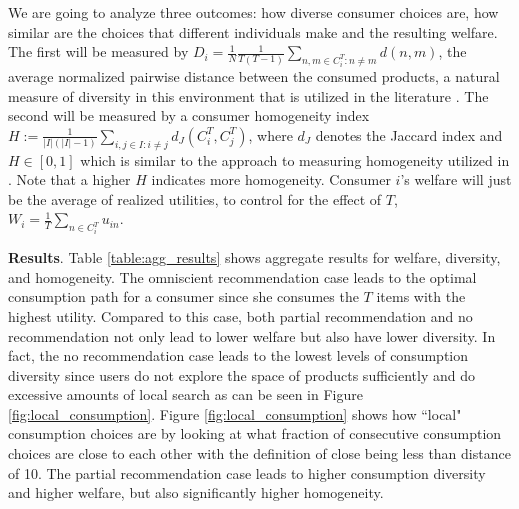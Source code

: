 \documentclass[sigconf]{acmart}
\begin{document}
We are going to analyze three outcomes: how diverse consumer choices are, how similar are the choices that different individuals make and the resulting welfare. The first will be measured by $D_i =\frac{1}{N} \frac{1}{T (T-1)}\sum_{n,m \in C_i^T: n \ne m} d(n,m)$, the average normalized pairwise distance between the consumed products, a natural measure of diversity in this environment that is utilized in the literature \cite{ziegler2005improving}. The second will be measured by a consumer homogeneity index $H:=\frac{1}{|I|(|I|-1)}\sum_{i,j \in I: i \ne j}d_J(C_i^T,C_j^T) $, where $d_J$ denotes the Jaccard index and $H \in [0,1]$ which is similar to the approach to measuring homogeneity utilized in \cite{chaney2018algorithmic}. Note that a higher $H$ indicates more homogeneity. Consumer $i$'s welfare will just be the average of realized utilities, to control for the effect of $T$, $W_i=\frac{1}{T}\sum_{n \in C_i^T} u_{in}$.
\par
\par
\noindent \textbf{Results}. Table \ref{table:agg_results} shows aggregate results for welfare, diversity, and homogeneity. The omniscient recommendation case leads to the optimal consumption path for a consumer since she consumes the $T$ items with the highest utility. Compared to this case, both partial recommendation and no recommendation not only lead to lower welfare but also have lower diversity. In fact, the no recommendation case leads to the lowest levels of consumption diversity since users do not explore the space of products sufficiently and do excessive amounts of local search as can be seen in Figure \ref{fig:local_consumption}. Figure \ref{fig:local_consumption} shows how ``local" consumption choices are by looking at what fraction of consecutive consumption choices are close to each other with the definition of close being less than distance of 10.  The partial recommendation case leads to higher consumption diversity and higher welfare, but also significantly higher homogeneity.
\end{document}
